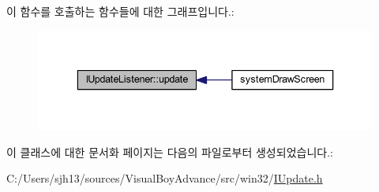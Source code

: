 이 함수를 호출하는 함수들에 대한 그래프입니다.\+:
\nopagebreak
\begin{figure}[H]
\begin{center}
\leavevmode
\includegraphics[width=336pt]{class_i_update_listener_ac03b85f52e858d0bbd08a4984b2cb929_icgraph}
\end{center}
\end{figure}


이 클래스에 대한 문서화 페이지는 다음의 파일로부터 생성되었습니다.\+:\begin{DoxyCompactItemize}
\item 
C\+:/\+Users/sjh13/sources/\+Visual\+Boy\+Advance/src/win32/\mbox{\hyperlink{_i_update_8h}{I\+Update.\+h}}\end{DoxyCompactItemize}
